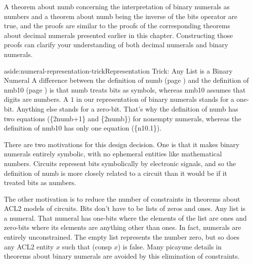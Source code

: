 A theorem about \textsf{numb} concerning the interpretation of
binary numerals as numbers and a theorem about \textsf{numb}
being the inverse of the \textsf{bits} operator are true,
and the proofs are similar to the proofs of the corresponding
theorems about decimal numerals presented earlier in this chapter.
Constructing those proofs can
clarify your understanding of both decimal numerals
and binary numerals.

\begin{aside}{aside:numeral-representation-trick}{Representation Trick: Any List is a Binary Numeral}
A difference between the definition of \textsf{numb} (page \pageref{nmb-defun})
and the definition of \textsf{nmb10} (page \pageref{nmb10-defun})
is that \textsf{numb} treats bits as symbols,
whereas \textsf{nmb10} assumes that digits are numbers.
A $1$ in our representation of binary numerals
stands for a one-bit. Anything else stands for a zero-bit.
That's why the definition of \textsf{numb} has two equations (\{2numb+1\} and \{2numb\})
for nonempty numerals,
whereas the definition of \textsf{nmb10} has only one equation (\{n10.1\}).

There are two motivations for this design decision.
One is that it makes binary numerals entirely symbolic,
with no ephemeral entities like mathematical numbers.
Circuits represent bits symbolically by electronic signals,
and so the definition of \textsf{numb} is more closely
related to a circuit than it would be if it treated
bits as numbers.

The other motivation is to reduce the number of constraints
in theorems about ACL2 models of circuits.
Bits don't have to be lists of zeros and ones.
Any list is a numeral.
That numeral has one-bits where the elements of the list are ones
and zero-bits where its elements are anything other than ones.
In fact, numerals are entirely unconstrained.
The empty list represents the number zero,
but so does any ACL2 entity $x$ such that \textsf{(consp $x$)} is false.
Many picayune details in theorems about binary numerals
are avoided by this elimination of constraints.
\end{aside}

